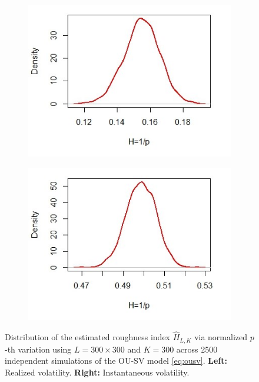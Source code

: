 \documentclass{article}
\begin{document}
\begin{figure}[htbp]
    \centering
    
    \begin{subfigure}{0.48\textwidth}
        \includegraphics[width=\linewidth]{ex6_densRV.jpeg}
    \end{subfigure}
    \hfill
    \begin{subfigure}{0.48\textwidth}
        \includegraphics[width=\linewidth]{ex6_densIV.jpeg}
    \end{subfigure}
    
    \caption{Distribution of the estimated roughness index $\hat{H}_{L,K}$ via normalized $p$-th variation using $L=300\times 300$ and $K=300$ across 2500 independent simulations of the OU-SV model \eqref{eq:ousv}. \textbf{Left:} Realized volatility. \textbf{Right:} Instantaneous volatility.}
    \label{fig:ex6dens}
\end{figure}
\end{document}
